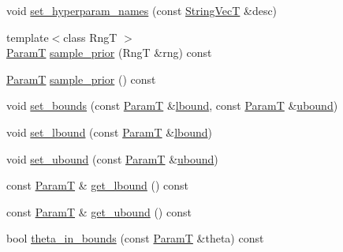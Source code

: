 \begin{DoxyCompactItemize}
\item 
void \hyperlink{classmappel_1_1PointEmitterModel_a6cdba258bda50cff162dc16a49383bb0}{set\+\_\+hyperparam\+\_\+names} (const \hyperlink{namespacemappel_aae88cf18bccfbb789a6019bcfbbfca68}{String\+VecT} \&desc)
\item 
{\footnotesize template$<$class RngT $>$ }\\\hyperlink{classmappel_1_1PointEmitterModel_a665ec6aea3aac139bb69a23c06d4b9a1}{ParamT} \hyperlink{classmappel_1_1PointEmitterModel_ae69bf3df2c94b351015bbf81e52dfe03}{sample\+\_\+prior} (RngT \&rng) const 
\item 
\hyperlink{classmappel_1_1PointEmitterModel_a665ec6aea3aac139bb69a23c06d4b9a1}{ParamT} \hyperlink{classmappel_1_1PointEmitterModel_abd9d2923ca9a838897a9b26bfb3ce073}{sample\+\_\+prior} () const 
\item 
void \hyperlink{classmappel_1_1PointEmitterModel_a31f139d9eb58f210f3359a9f5be9dd15}{set\+\_\+bounds} (const \hyperlink{classmappel_1_1PointEmitterModel_a665ec6aea3aac139bb69a23c06d4b9a1}{ParamT} \&\hyperlink{classmappel_1_1PointEmitterModel_a889bc82f74cfa654da121e5770296ab2}{lbound}, const \hyperlink{classmappel_1_1PointEmitterModel_a665ec6aea3aac139bb69a23c06d4b9a1}{ParamT} \&\hyperlink{classmappel_1_1PointEmitterModel_a35b883e84b6a2e0093bdf482c623beef}{ubound})
\item 
void \hyperlink{classmappel_1_1PointEmitterModel_a737fa5857415b9830fa2e5ccdff48541}{set\+\_\+lbound} (const \hyperlink{classmappel_1_1PointEmitterModel_a665ec6aea3aac139bb69a23c06d4b9a1}{ParamT} \&\hyperlink{classmappel_1_1PointEmitterModel_a889bc82f74cfa654da121e5770296ab2}{lbound})
\item 
void \hyperlink{classmappel_1_1PointEmitterModel_a7363961cc405e585b39e81a7ad85c8d6}{set\+\_\+ubound} (const \hyperlink{classmappel_1_1PointEmitterModel_a665ec6aea3aac139bb69a23c06d4b9a1}{ParamT} \&\hyperlink{classmappel_1_1PointEmitterModel_a35b883e84b6a2e0093bdf482c623beef}{ubound})
\item 
const \hyperlink{classmappel_1_1PointEmitterModel_a665ec6aea3aac139bb69a23c06d4b9a1}{ParamT} \& \hyperlink{classmappel_1_1PointEmitterModel_aeb486e8f6f6fa694e3746e84eebcf848}{get\+\_\+lbound} () const 
\item 
const \hyperlink{classmappel_1_1PointEmitterModel_a665ec6aea3aac139bb69a23c06d4b9a1}{ParamT} \& \hyperlink{classmappel_1_1PointEmitterModel_a0dfb473c48d177a4540d328abb03cd55}{get\+\_\+ubound} () const 
\item 
bool \hyperlink{classmappel_1_1PointEmitterModel_ad50dfc29b6e7167fb4caf8683353079d}{theta\+\_\+in\+\_\+bounds} (const \hyperlink{classmappel_1_1PointEmitterModel_a665ec6aea3aac139bb69a23c06d4b9a1}{ParamT} \&theta) const 

\end{DoxyCompactItemize}
